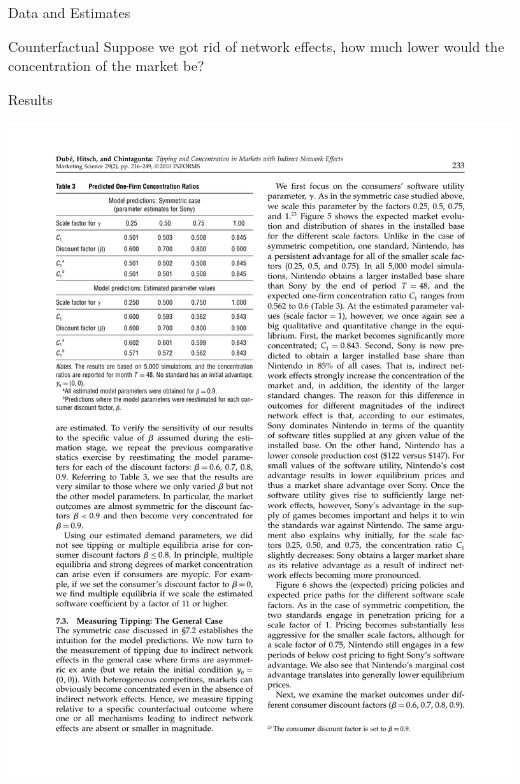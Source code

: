 \documentclass[xcolor=pdftex,dvipsnames,table,mathserif]{beamer}
\begin{document}
\begin{frame}{Data and Estimates}
\begin{center}
\end{center}
\end{frame}

\begin{frame}{Counterfactual}
Suppose we got rid of network effects, how much lower would the concentration of the market be?
\end{frame}

\begin{frame}{Results}
\begin{center}
\includegraphics[scale=0.65]{resources/dube-table3}

\end{center}
\end{frame}
\end{document}

